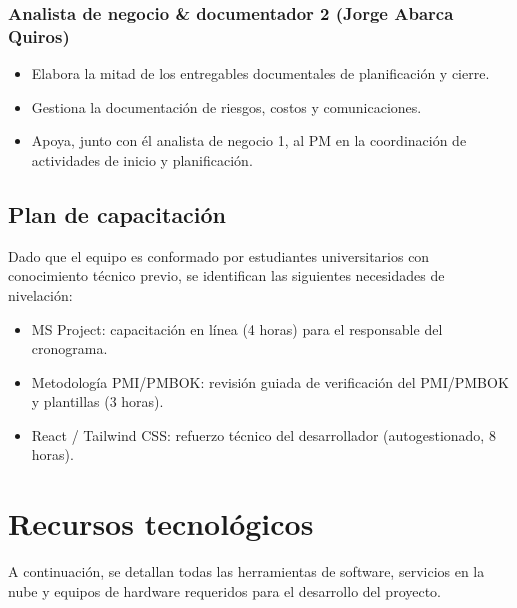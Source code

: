 \documentclass[11pt,spanish]{article}
\begin{document}
\subsubsection{Analista de negocio \& documentador 2 (Jorge Abarca Quiros)}

\begin{itemize}
    \item Elabora la mitad de los entregables documentales de planificación y cierre.
    \item Gestiona la documentación de riesgos, costos y comunicaciones.
    \item Apoya, junto con él analista de negocio 1, al PM en la coordinación de actividades de inicio y planificación.
\end{itemize}

\subsection{Plan de capacitación}

Dado que el equipo es conformado por estudiantes universitarios con conocimiento técnico previo, se identifican las siguientes necesidades de nivelación:

\begin{itemize}
    \item MS Project: capacitación en línea (4 horas) para el responsable del cronograma.
    \item Metodología PMI/PMBOK: revisión guiada de verificación del PMI/PMBOK y plantillas (3 horas).
    \item React / Tailwind CSS: refuerzo técnico del desarrollador (autogestionado, 8 horas).
\end{itemize}

\section{Recursos tecnológicos}

A continuación, se detallan todas las herramientas de software, servicios en la nube y equipos de hardware requeridos para el desarrollo del proyecto.
\end{document}
